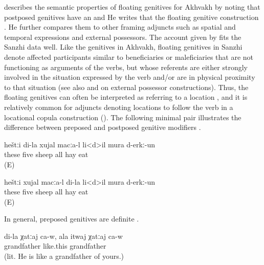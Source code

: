 \citet[346]{Creissels2013} describes the semantic properties of floating genitives for Akhvakh by noting that postposed genitives have an  and  He writes that the floating genitive construction  \citep[333]{Creissels2013}. He further compares them to other framing adjuncts such as spatial and temporal expressions and external possessors. The account given by  fits the Sanzhi data well. Like the genitives in Akhvakh, floating genitives in Sanzhi denote affected participants similar to beneficiaries or maleficiaries that are not functioning as arguments of the verbs, but whose referents are either strongly involved in the situation expressed by the verb and/or are in physical proximity to that situation (see also \citealp{Shibatani1994} and \citealp{Serzhant2016} on external possessor constructions). Thus, the floating genitives can often be interpreted as referring to a location , and it is relatively common for adjuncts denoting locations to follow the verb in a locational copula construction (). The following minimal pair illustrates the difference between preposed and postposed genitive modifiers .
%
\begin{exe}
	\ex	\label{ex:sheep eat hay minimal pair}
	\begin{xlist}
		\ex	\label{ex:‎My five sheep ate all the hay@A}
		\gll	heštːi	di-la	xujal	macːa-l	li<d>il	mura	d-erkː-un\\
			these		five	sheep	all	hay	eat\\
		\glt	{} (E)

		\ex	\label{ex:‎The five sheep of mine ate all the hay}
		\gll	heštːi	xujal	macːa-l	di-la	li<d>il	mura	d-erkː-un\\
			these		five	sheep	 all	hay	eat\\
		\glt	{} (E)
	\end{xlist}
\end{exe}

In general, preposed genitives are definite .
%
\begin{exe}
	\ex	\label{ex:‎(He) is my (real) grandfather. For you he is only an old man extraposed genitive}
	\gll	di-la	χatːaj	ca-w,	ala	itwaj	χatːaj	ca-w\\
			grandfather				like.this	grandfather	\\
	\glt	{} (lit. He is like a grandfather of yours.)
\end{exe}

